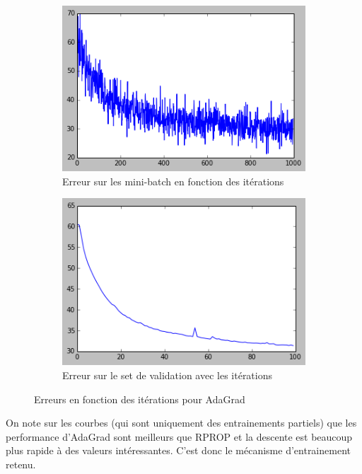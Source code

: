 \documentclass[conference]{IEEEtran}
\begin{document}
\begin{figure}[h]
\begin{subfigure}{0.48\columnwidth}
\includegraphics[width=\textwidth]{fig/CourbeMbeAdaGrad.png}
\caption{Erreur sur les mini-batch en fonction des itérations}
\end{subfigure}
\begin{subfigure}{0.48\columnwidth}
\includegraphics[width=\textwidth]{fig/CourbeValAdaGrad.png}
\caption{Erreur sur le set de validation avec les itérations}
\end{subfigure}
\caption{Erreurs en fonction des itérations pour AdaGrad}
\label{AdaErreur}
\end{figure}

On note sur les courbes (qui sont uniquement des entrainements partiels) que les performance d'AdaGrad sont meilleurs que RPROP et la descente est beaucoup plus rapide à des valeurs intéressantes. C'est donc le mécanisme d'entrainement retenu.
\end{document}
